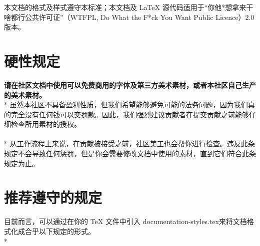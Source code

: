     本文档的格式及样式遵守本标准；本文档及 LaTeX 源代码适用于“你他*想拿来干啥都行公共许可证”（WTFPL, Do What the F*ck You Want Public Licence）2.0 版本。


    \section{硬性规定}
    
    \textbf{请在社区文档中使用可以免费商用的字体及第三方美术素材，或者本社区自己生产的美术素材。}\\*
    虽然本社区不具备盈利性质，但我们希望能够避免可能的法务问题，因为我们真的完全没有任何钱可以交罚款。因此，我们强烈建议贡献者在提交贡献之前能够仔细检查所用素材的授权。
    \\
    \\*
    从工作流程上来说，在贡献被接受之前，社区美工也会帮你进行检查。违反此条规定不会导致任何惩罚，但是你会需要修改文档中使用的素材，直到它们符合此条规定为止。


    \section{推荐遵守的规定}
    目前而言，可以通过在你的 TeX 文件中引入 \ttfamily documentation-styles.tex\rmfamily 来将文档格式化成合乎以下规定的形式。\\*

